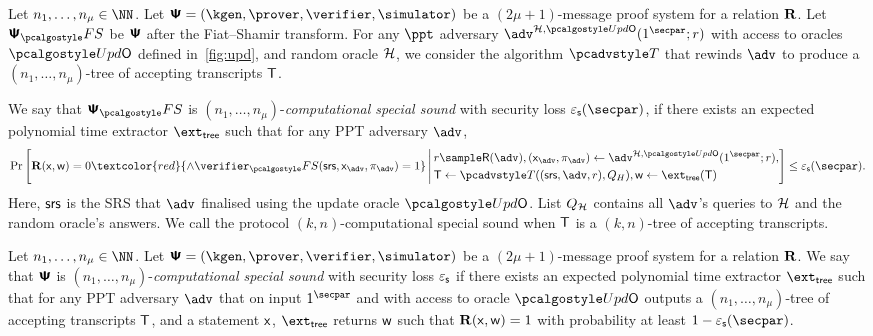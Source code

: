 \begin{definition}
	Let $n_1, \ldots, n_\mu \in \NN$. Let $\proofsystem = (\kgen, \prover, \verifier, \simulator)$ be a $(2 \mu +
	1)$-message proof system for a relation $\mathbf{R}$. Let $\proofsystem_\fs$
  be $\bm{\mathsf{\Psi}}$ after the Fiat--Shamir transform. For any $\ppt$ adversary $\advse^{\ro, \initU} (1^\secpar; r)$ with access to oracles $\initU$ defined in~\cref{fig:upd}, and random oracle $\mathcal{H}$, we consider the algorithm $\tdv$
	that rewinds $\adv$ to produce a $(n_1,
	\ldots, n_\mu)$-tree of
	accepting transcripts $\mathsf{T}$.
	
	We say that $\psfs$ is $(n_1,
	\ldots, n_\mu)$-\emph{computational special sound} with security loss $\epss(\secpar)$, if there exists an expected polynomial time extractor $\extt$ such that for any PPT adversary $\advse$,
	\begin{align*}
	\Pr\left[
	\REL(\inp, \wit) = 0
	\textcolor{red}{\wedge \verifier_\fs(\srs, \inp_{\advse}, \pi_\advse) = 1}
	\,\Biggl|\,
	\begin{aligned}
	& r \sample \RND{\advse},
	(\inp_{\advse}, \zkproof_{\advse}) \gets \advse^{\ro, \initU} (1^\secpar; r), \\
	&    \tree \gets \tdv((\srs,\adv,r),Q_{H}),
	\wit \gets \extt(\tree)
	\end{aligned}
	\right] \leq \epss(\secpar).
	\end{align*}
	Here, $\mathsf{srs}$ is the SRS that $\advse$ finalised using the update oracle $\initU$.
	List $Q_{\mathcal{H}}$ contains all $\advse$'s
	queries to $\mathcal{H}$ and the random oracle's answers. We call the protocol $(k, n)$-computational special sound when $\mathsf{T}$ is a $(k,n)$-tree of accepting transcripts.
\end{definition}

\begin{definition}
	Let $n_1, \ldots, n_\mu \in \NN$. Let $\proofsystem = (\kgen, \prover, \verifier, \simulator)$ be a $(2 \mu +
	1)$-message proof system for a relation $\mathbf{R}$. 
	We say that $\bm{\mathsf{\Psi}}$ is $(n_1,
	\ldots, n_\mu)$-\emph{computational special sound} with security loss $\varepsilon_{\mathsf{s}}$ if there exists an expected polynomial time extractor $\extt$ such that for any PPT adversary $\adv$ that on input $1^\secpar$ and with access to oracle $\initU$ outputs a $(n_1,
	\ldots, n_\mu)$-tree of accepting transcripts $\mathsf{T}$, and a statement $\mathsf{x}$, $\extt$ returns $\mathsf{w}$ such that $\mathbf{R}(\mathsf{x}, \mathsf{w}) = 1$ with probability at least $1-\epss(\secpar)$. 
\end{definition}

